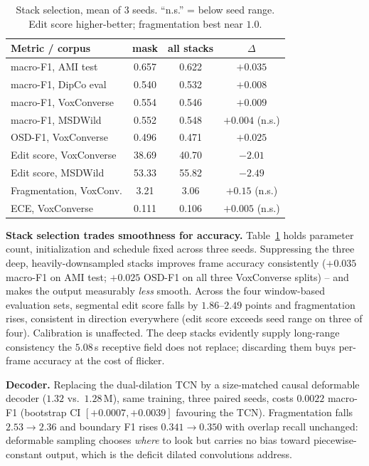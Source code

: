 \documentclass[10pt,conference]{IEEEtran}
\begin{document}
\begin{table}[t]
\centering
\caption{Stack selection, mean of 3 seeds. ``n.s.'' = below seed range.
Edit score higher-better; fragmentation best near $1.0$.}
\label{tab:ablation}
\small
\begin{tabular}{lccc}
\toprule
Metric / corpus & mask & all stacks & $\Delta$ \\
\midrule
macro-F1, AMI test        & 0.657 & 0.622 & $+0.035$ \\
macro-F1, DipCo eval      & 0.540 & 0.532 & $+0.008$ \\
macro-F1, VoxConverse     & 0.554 & 0.546 & $+0.009$ \\
macro-F1, MSDWild         & 0.552 & 0.548 & $+0.004$ (n.s.) \\
OSD-F1, VoxConverse       & 0.496 & 0.471 & $+0.025$ \\
\midrule
Edit score, VoxConverse   & 38.69 & 40.70 & $-2.01$ \\
Edit score, MSDWild       & 53.33 & 55.82 & $-2.49$ \\
Fragmentation, VoxConv.   & 3.21 & 3.06 & $+0.15$ (n.s.) \\
ECE, VoxConverse          & 0.111 & 0.106 & $+0.005$ (n.s.) \\
\bottomrule
\end{tabular}
\end{table}

\textbf{Stack selection trades smoothness for accuracy.}
Table~\ref{tab:ablation} holds parameter count, initialization and schedule
fixed across three seeds. Suppressing the three deep, heavily-downsampled
stacks improves frame accuracy consistently ($+0.035$ macro-F1 on AMI test;
$+0.025$ OSD-F1 on all three VoxConverse splits) -- and makes the output
measurably \emph{less} smooth. Across the four window-based evaluation sets,
segmental edit score falls by $1.86$--$2.49$ points and fragmentation rises,
consistent in direction everywhere (edit score exceeds seed range on three
of four). Calibration is unaffected. The deep stacks evidently supply
long-range consistency the $5.08$\,s receptive field does not replace;
discarding them buys per-frame accuracy at the cost of flicker.

\textbf{Decoder.} Replacing the dual-dilation TCN by a size-matched causal
deformable decoder ($1.32$ vs.\ $1.28$\,M), same training, three paired
seeds, costs $0.0022$ macro-F1 (bootstrap CI $[+0.0007,+0.0039]$ favouring
the TCN). Fragmentation falls $2.53\!\rightarrow\!2.36$ and boundary F1
rises $0.341\!\rightarrow\!0.350$ with overlap recall unchanged: deformable
sampling chooses \emph{where} to look but carries no bias toward
piecewise-constant output, which is the deficit dilated convolutions
address.
\end{document}
